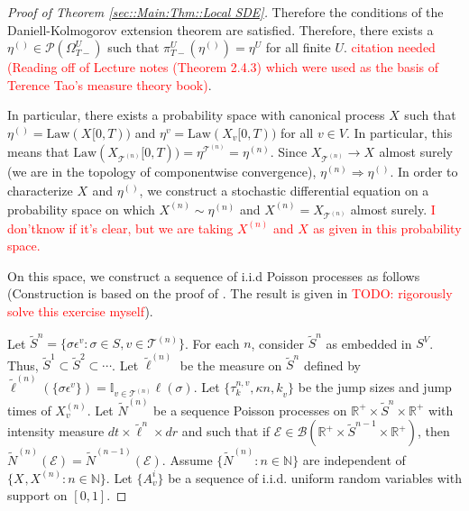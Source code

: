 \documentclass[12pt]{article}
\newcommand{\mb}{\mathbb}
\newcommand{\mc}{\mathcal}
\newcommand{\ms}{\mathscr}
\newcommand{\ra}{\rightarrow}
\newcommand{\te}{\text}
\newcommand{\ep}{\epsilon}
\newcommand{\tr}{\textcolor{red}}
\newcommand{\ind}{\hspace{24pt}}
\renewcommand{\v}{v}							%
\renewcommand{\U}{U}							%
\renewcommand{\S}{S}							%
\newcommand{\s}{\sigma}							%
\newcommand{\ev}{\ep}							%
\newcommand{\T}{T}								%
\renewcommand{\t}{t}							%
\newcommand{\sset}{\Omega}						%
\newcommand{\proj}{\pi}							%
\newcommand{\X}{X}								%
\newcommand{\vind}[1]{^{#1}}					%
\newcommand{\carp}[1]{^{#1}}					%
\newcommand{\vsi}[1]{^{#1}}						%
\newcommand{\cind}[1]{_{#1}}					%
\newcommand{\tip}[1]{#1}						%
\newcommand{\ts}[1]{_{#1}}						%
\newcommand{\slnvind}[2]{^{#1,#2}}				%
\newcommand{\tree}{\mc{T}}						%
\newcommand{\sln}[1]{^{(#1)}}					%
\newcommand{\poiss}{N}							%
\newcommand{\Sm}{\ell}							%
\renewcommand{\r}{r}							%
\newcommand{\alt}[1]{\widetilde{#1}}			%
\newcommand{\indx}[1]{_{#1}}					%
\newcommand{\mmm}{\eta}							%
\newcommand{\law}{\te{Law}}						%
\newcommand{\rt}{\tau}							%
\renewcommand{\it}{k}							%
\newcommand{\evnt}{\mc{E}}						%
\newcommand{\rv}{A}								%
\renewcommand{\mark}{\kappa}					%
\begin{document}
\begin{proof}[Proof of Theorem \ref{sec::Main:Thm::Local SDE}]
Therefore the conditions of the Daniell-Kolmogorov extension theorem are satisfied. Therefore, there exists a \(\mmm\sln{}\ts{}\in \ms{P}(\sset\vsi{\U}\ts{\T-})\) such that \(\proj\vsi{\U}\ts{\T-}(\mmm\sln{}\ts{}) =\mmm\vind{\U}\ts{}\) for all finite \(\U\). \tr{citation needed (Reading off of Lecture notes (Theorem 2.4.3) which were used as the basis of Terence Tao's measure theory book)}.

\ind In particular, there exists a probability space with canonical process \(\X\cind{}\tip{}\) such that \(\mmm\sln{}\ts{} = \law(\X\cind{}\tip{[0,\T)})\) and \(\mmm\vind{\v}\ts{} = \law(\X\cind{\v}\tip{[0,\T)})\) for all \(\v \in V\). In particular, this means that \(\law(\X\cind{\tree\sln{n}}\tip{[0,\T)}) = \mmm\vind{\tree\sln{n}}\ts{} = \mmm\sln{n}\ts{}\). Since \(\X\cind{\tree\sln{n}}\tip{} \ra \X\cind{}\tip{}\) almost surely (we are in the topology of componentwise convergence), \(\mmm\sln{n}\ts{} \Rightarrow \mmm\sln{}\ts{}\). In order to characterize \(\X\cind{}\tip{}\) and \(\mmm\sln{}\ts{}\), we construct a stochastic differential equation on a probability space on which \(\X\sln{n}\cind{}\tip{} \sim \mmm\sln{n}\ts{}\) and \(\X\sln{n}\cind{}\tip{} = \X\cind{\tree\sln{n}}\tip{}\) almost surely. \tr{I don'\t know if it's clear, but we are taking \(\X\sln{n}\cind{}\tip{}\) and \(\X\cind{}\tip{}\) as given in this probability space.}

\ind On this space, we construct a sequence of i.i.d Poisson processes as follows (Construction is based on the proof of \cite[Theorem 14.7.1(b)]{DalVer08}. The result is given in \cite[Exercise 14.7.1]{DalVer08} \tr{TODO: rigorously solve this exercise myself}).

\ind Let \(\alt{\S}^n = \{\s\ev\vind{\v}: \s\in\S,\v \in \tree\sln{n}\}\). For each \(n\), consider \(\alt{\S}^n\) as embedded in \(\S\carp{V}\). Thus, \(\alt{\S}^1 \subset \alt{\S}^2 \subset \cdots\). Let \(\alt{\Sm}\sln{n}\) be the measure on \(\alt{\S}^n\) defined by \(\alt{\Sm}\sln{n}(\{\s\ev\vind{\v}\}) = \mb{I}_{\v \in \tree\sln{n}}\Sm(\s)\). Let \(\{\rt\slnvind{n}{\v}\indx{\it},\mark{n,\it}_{\v}\}\) be the jump sizes and jump times of \(\X\sln{n}\cind{\v}\tip{}\). Let \(\alt{\poiss}\sln{n}\) be a sequence Poisson processes on \(\mb{R}^+\times\alt{\S}^n\times \mb{R}^+\) with intensity measure \(d\t\times\alt{\Sm}^n\times d\r\) and such that if \(\evnt \in \ms{B}(\mb{R}^+\times\alt{\S}^{n-1}\times \mb{R}^+)\), then \(\alt{\poiss}\sln{n}(\evnt) = \alt{\poiss}\sln{n-1}(\evnt)\). Assume \(\{\alt{\poiss}\sln{n}:n\in\mb{N}\}\) are independent of \(\{\X\cind{}\tip{},\X\sln{n}\cind{}\tip{}:n\in\mb{N}\}\). Let \(\{\rv_{\v}^{i}\}\) be a sequence of i.i.d. uniform random variables with support on \([0,1]\).


\end{proof}
\end{document}

